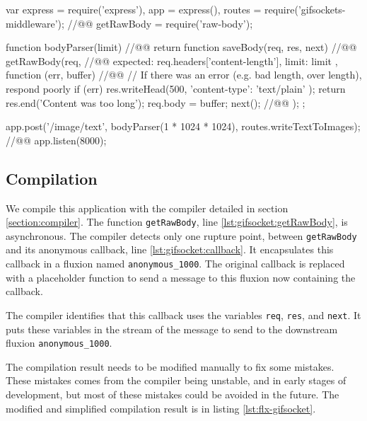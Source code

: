 \begin{code}[js, caption={Simplified version of gifsockets-server},label={lst:gifsocket}]
var express = require('express'),
    app = express(),
    routes = require('gifsockets-middleware'); //@\label{lst:gifsocket:gif-mw}@
    getRawBody = require('raw-body');

function bodyParser(limit) { //@\label{lst:gifsocket:bodyParser}@
  return function saveBody(req, res, next) { //@\label{lst:gifsocket:saveBody}@
    getRawBody(req, { //@\label{lst:gifsocket:getRawBody}@
      expected: req.headers['content-length'],
      limit: limit
    }, function (err, buffer) { //@\label{lst:gifsocket:callback}@
      // If there was an error (e.g. bad length, over length), respond poorly
      if (err) {
        res.writeHead(500, {
          'content-type': 'text/plain'
        });
        return res.end('Content was too long');
      }
      req.body = buffer;
      next(); //@\label{lst:gifsocket:next}@
    });
  };
}

app.post('/image/text', bodyParser(1 * 1024 * 1024), routes.writeTextToImages); //@\label{lst:gifsocket:app.post}@
app.listen(8000);
\end{code}


\subsection{Compilation}

We compile this application with the compiler detailed in section \ref{section:compiler}.
The function \texttt{getRawBody}, line \ref{lst:gifsocket:getRawBody}, is asynchronous.
The compiler detects only one rupture point, between \texttt{getRawBody} and its anonymous callback, line \ref{lst:gifsocket:callback}.
It encapsulates this callback in a fluxion named \texttt{anonymous\-\_1000}.
The original callback is replaced with a placeholder function to send a message to this fluxion now containing the callback.

The compiler identifies that this callback uses the variables \texttt{req}, \texttt{res}, and \texttt{next}.
It puts these variables in the stream of the message to send to the downstream fluxion \texttt{anonymous\-\_1000}.

The compilation result needs to be modified manually to fix some mistakes.
These mistakes comes from the compiler being unstable, and in early stages of development, but most of these mistakes could be avoided in the future.
The modified and simplified compilation result is in listing \ref{lst:flx-gifsocket}.

